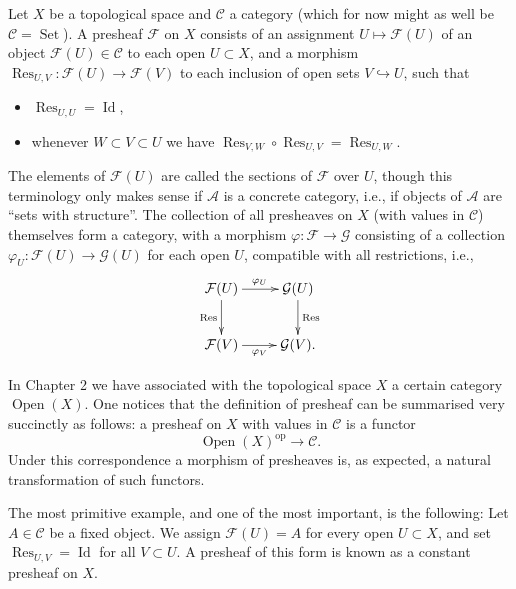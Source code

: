 \begin{definition}
\label{definition-presheaf}
Let $X$ be a topological space and $\mathcal C$ a category (which for now might as
well be $\mathcal C = \operatorname{Set}$). A presheaf $\mathcal F$ on $X$ consists of an assignment
$U\mapsto\mathcal F(U)$ of an object $\mathcal F(U)\in\mathcal C$ to each open $U\subset X$, and a
morphism $\operatorname{Res}_{U,V}:\mathcal F(U)\to\mathcal F(V)$ to each inclusion of open sets
$V\hookrightarrow U$, such that
\begin{itemize}
\item $\operatorname{Res}_{U,U}=\operatorname{Id}$,
\item whenever $W\subset V\subset U$ we have
$\operatorname{Res}_{V,W}\circ\operatorname{Res}_{U,V}=\operatorname{Res}_{U,W}$.
\end{itemize}
The elements of $\mathcal F(U)$ are called the sections of $\mathcal F$ over $U$, though this terminology only makes
sense if $\mathcal A$ is a concrete category, i.e., if objects of $\mathcal A$ are “sets with structure”. The collection
of all presheaves on $X$ (with values in $\mathcal C$) themselves form a category, with a morphism
$\varphi:\mathcal F\to\mathcal G$ consisting of a collection
$\varphi_U:\mathcal F(U)\to\mathcal G(U)$ for each open $U$, compatible with all restrictions, i.e.,
\[
\xymatrix{
\mathcal F(U)\ar[r]^{\varphi_U}\ar[d]_{\operatorname{Res}}&
\mathcal G(U)\ar[d]^{\operatorname{Res}}\\
\mathcal F(V)\ar[r]_{\varphi_V}&
\mathcal G(V).
}
\]
\end{definition}

\begin{remark}
In Chapter 2 we have associated with the topological space $X$ a certain
category $\operatorname{Open}(X)$. One notices that the definition of presheaf can be summarised very
succinctly as follows: a presheaf on $X$ with values in $\mathcal C$ is a functor
\[
\operatorname{Open}(X)^{\mathrm{op}}\to\mathcal C.
\]
Under this correspondence a morphism of presheaves is, as expected, a natural transformation of such functors.
\end{remark}

The most primitive example, and one of the most important, is the following: Let $A\in\mathcal C$
be a fixed object. We assign $\mathcal F(U)=A$ for every open $U\subset X$, and set
$\operatorname{Res}_{U,V}=\operatorname{Id}$ for all $V\subset U$. A presheaf of this form is known as a constant presheaf on $X$.

